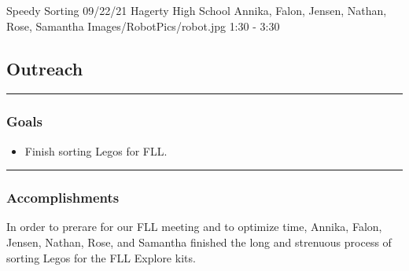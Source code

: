 \insertmeeting 
	{Speedy Sorting} 
	{09/22/21}
	{Hagerty High School}
	{Annika, Falon, Jensen, Nathan, Rose, Samantha}
	{Images/RobotPics/robot.jpg}
	{1:30 - 3:30}
	
\subsection*{Outreach}
\noindent\hfil\rule{\textwidth}{.4pt}\hfil
\subsubsection*{Goals}
\begin{itemize}
    \item Finish sorting Legos for FLL.

\end{itemize} 

\noindent\hfil\rule{\textwidth}{.4pt}\hfil

\subsubsection*{Accomplishments}
In order to prerare for our FLL meeting and to optimize time, Annika, Falon, Jensen, Nathan, Rose, and Samantha finished the long and strenuous process of sorting Legos for the FLL Explore kits. 
